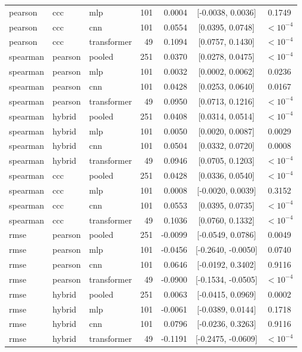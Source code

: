 \begin{longtable}{lllrrcc}
pearson & ccc & mlp & 101 & 0.0004 & [-0.0038, 0.0036] & 0.1749 \\
pearson & ccc & cnn & 101 & 0.0554 & [0.0395, 0.0748] & $<10^{-4}$ \\
pearson & ccc & transformer & 49 & 0.1094 & [0.0757, 0.1430] & $<10^{-4}$ \\
spearman & pearson & pooled & 251 & 0.0370 & [0.0278, 0.0475] & $<10^{-4}$ \\
spearman & pearson & mlp & 101 & 0.0032 & [0.0002, 0.0062] & 0.0236 \\
spearman & pearson & cnn & 101 & 0.0428 & [0.0253, 0.0640] & 0.0167 \\
spearman & pearson & transformer & 49 & 0.0950 & [0.0713, 0.1216] & $<10^{-4}$ \\
spearman & hybrid & pooled & 251 & 0.0408 & [0.0314, 0.0514] & $<10^{-4}$ \\
spearman & hybrid & mlp & 101 & 0.0050 & [0.0020, 0.0087] & 0.0029 \\
spearman & hybrid & cnn & 101 & 0.0504 & [0.0332, 0.0720] & 0.0008 \\
spearman & hybrid & transformer & 49 & 0.0946 & [0.0705, 0.1203] & $<10^{-4}$ \\
spearman & ccc & pooled & 251 & 0.0428 & [0.0336, 0.0540] & $<10^{-4}$ \\
spearman & ccc & mlp & 101 & 0.0008 & [-0.0020, 0.0039] & 0.3152 \\
spearman & ccc & cnn & 101 & 0.0553 & [0.0395, 0.0735] & $<10^{-4}$ \\
spearman & ccc & transformer & 49 & 0.1036 & [0.0760, 0.1332] & $<10^{-4}$ \\
rmse & pearson & pooled & 251 & -0.0099 & [-0.0549, 0.0786] & 0.0049 \\
rmse & pearson & mlp & 101 & -0.0456 & [-0.2640, -0.0050] & 0.0740 \\
rmse & pearson & cnn & 101 & 0.0646 & [-0.0192, 0.3402] & 0.9116 \\
rmse & pearson & transformer & 49 & -0.0900 & [-0.1534, -0.0505] & $<10^{-4}$ \\
rmse & hybrid & pooled & 251 & 0.0063 & [-0.0415, 0.0969] & 0.0002 \\
rmse & hybrid & mlp & 101 & -0.0061 & [-0.0389, 0.0144] & 0.1718 \\
rmse & hybrid & cnn & 101 & 0.0796 & [-0.0236, 0.3263] & 0.9116 \\
rmse & hybrid & transformer & 49 & -0.1191 & [-0.2475, -0.0609] & $<10^{-4}$ \\

\end{longtable}
